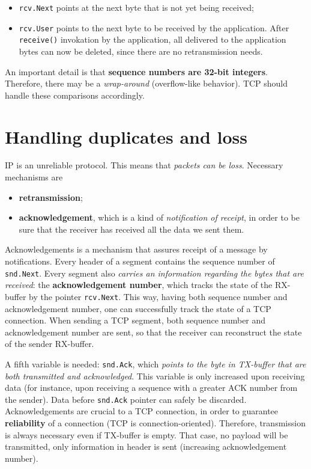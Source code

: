 \documentclass[a4paper, 12pt]{report}
\begin{document}
\begin{itemize}
	\item \texttt{rcv.Next} points at the next byte that is not yet being
		received;
	\item \texttt{rcv.User} points to the next byte to be received by the
		application. After \texttt{receive()} invokation by the
		application, all delivered to the application bytes can now be
		deleted, since there are no retransmission needs. 
\end{itemize}

An important detail is that \textbf{sequence numbers are 32-bit integers}.
Therefore, there may be a \emph{wrap-around} (overflow-like behavior). TCP
should handle these comparisons accordingly.

\section{Handling duplicates and loss}

IP is an unreliable protocol. This means that \emph{packets can be loss}.
Necessary mechanisms are

\begin{itemize}
	\item \textbf{retransmission};
	\item \textbf{acknowledgement}, which is a kind of \emph{notification
		of receipt}, in order to be sure that the receiver has received
		all the data we sent them.
\end{itemize}

Acknowledgements is a mechanism that assures receipt of a message by
notifications. Every header of a segment contains the sequence number of
\texttt{snd.Next}. Every segment also \emph{carries an information regarding
the bytes that are received}: the \textbf{acknowledgement number}, which tracks
the state of the RX-buffer by the pointer \texttt{rcv.Next}. This way, having
both sequence number and acknowledgement number, one can successfully track the
state of a TCP connection. When sending a TCP segment, both sequence number and
acknowledgement number are sent, so that the receiver can reconstruct the state
of the sender RX-buffer.

A fifth variable is needed: \texttt{snd.Ack}, which \emph{points to the byte in
TX-buffer that are both transmitted and acknowledged}. This variable is only
increased upon receiving data (for instance, upon receiving a sequence with a
greater ACK number from the sender). Data before \texttt{snd.Ack} pointer can
safely be discarded. Acknowledgements are crucial to a TCP connection, in order
to guarantee \textbf{reliability} of a connection (TCP is connection-oriented).
Therefore, transmission is always necessary even if TX-buffer is empty. That
case, no payload will be transmitted, only information in header is sent
(increasing acknowledgement number). 
\end{document}
